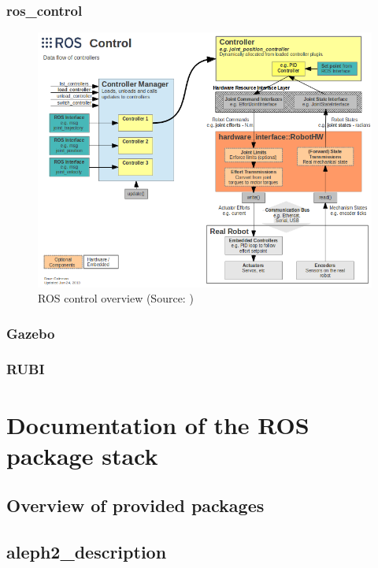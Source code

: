 \documentclass[english,inz,shortabstract]{iithesis}
\begin{document}
    \subsection{ros\_control}

    \begin{figure}[ht]
        \centering
        \includegraphics[width=\textwidth]{img/ros_control.png}
        \caption{ROS control overview (Source: \cite{ros:control})}
        \label{fig:ros_control}
    \end{figure}


    \subsection{Gazebo}

    \subsection{RUBI}


\chapter{Documentation of the ROS package stack}

\section{Overview of provided packages}

\section{aleph2\_description}
\end{document}

